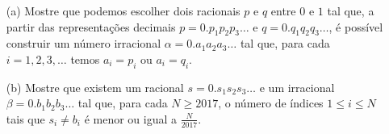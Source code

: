 \begin{itemize}
	\item[(a)] Mostre que podemos escolher dois racionais $p$ e $q$ entre $0$ e $1$ tal que, a partir das representações decimais $p = 0.p_1p_2p_3\dots$ e $q = 0.q_1q_2q_3\dots$, é possível construir um número irracional $\alpha = 0.a_1a_2a_3\dots$ tal que, para cada $i = 1, 2, 3, \dots$ temos $a_i = p_i$ ou $a_i = q_i$.

	\item[(b)] Mostre que existem um racional $s = 0.s_1s_2s_3\dots$ e um irracional $\beta = 0.b_1b_2b_3\dots$ tal que, para cada $N \geq 2017$, o número de índices $1 \leq i \leq N$ tais que $s_i \neq b_i$ é menor ou igual a $\frac{N}{2017}$.
\end{itemize}
